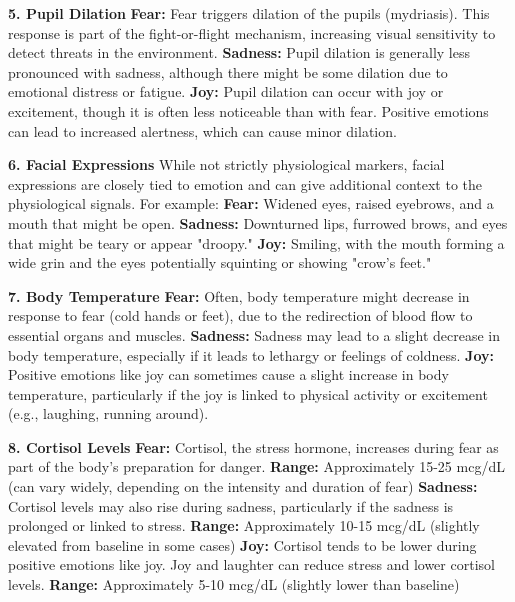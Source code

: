 \documentclass[12pt, research paper]{report}
\begin{document}
	\noindent \textbf{5. Pupil Dilation}
	\newline \textbf{Fear:} Fear triggers dilation of the pupils (mydriasis). This response is part of the fight-or-flight mechanism, increasing visual sensitivity to detect threats in the environment. 
	\newline \textbf{Sadness:} Pupil dilation is generally less pronounced with sadness, although there might be some dilation due to emotional distress or fatigue.
	\newline \textbf{Joy:} Pupil dilation can occur with joy or excitement, though it is often less noticeable than with fear. Positive emotions can lead to increased alertness, which can cause minor dilation.
	\bigskip 
	
	\noindent \textbf{6. Facial Expressions}
	\newline While not strictly physiological markers, facial expressions are closely tied to emotion and can give additional context to the physiological signals. For example:
	\newline \textbf{Fear:} Widened eyes, raised eyebrows, and a mouth that might be open.
	\newline \textbf{Sadness:} Downturned lips, furrowed brows, and eyes that might be teary or appear "droopy."
	\newline \textbf{Joy:} Smiling, with the mouth forming a wide grin and the eyes potentially squinting or showing "crow's feet."
	\bigskip 
	
	\noindent \textbf{7. Body Temperature}
	\newline \textbf{Fear:} Often, body temperature might decrease in response to fear (cold hands or feet), due to the redirection of blood flow to essential organs and muscles.
	\newline \textbf{Sadness:} Sadness may lead to a slight decrease in body temperature, especially if it leads to lethargy or feelings of coldness. 
	\newline \textbf{Joy:} Positive emotions like joy can sometimes cause a slight increase in body temperature, particularly if the joy is linked to physical activity or excitement (e.g., laughing, running around).
	\bigskip 
	
	\noindent \textbf{8. Cortisol Levels}
	\newline \textbf{Fear:} Cortisol, the stress hormone, increases during fear as part of the body's preparation for danger.
	\newline \textbf{Range:} Approximately 15-25 mcg/dL (can vary widely, depending on the intensity and duration of fear)
	\newline \textbf{Sadness:} Cortisol levels may also rise during sadness, particularly if the sadness is prolonged or linked to stress.
	\newline \textbf{Range:} Approximately 10-15 mcg/dL (slightly elevated from baseline in some cases)
	\newline \textbf{Joy:} Cortisol tends to be lower during positive emotions like joy. Joy and laughter can reduce stress and lower cortisol levels.
	\newline \textbf{Range:} Approximately 5-10 mcg/dL (slightly lower than baseline)
	\bigskip 
	
\end{document}
